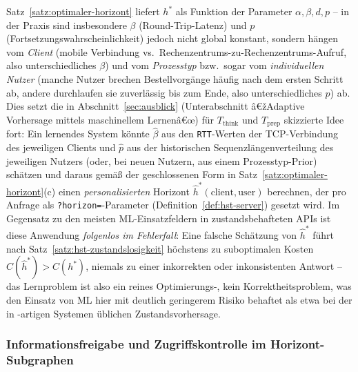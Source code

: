 ﻿\documentclass[a4paper,12pt]{article}
\theoremstyle{definition}
\begin{document}
Satz~\ref{satz:optimaler-horizont} liefert $h^\ast$ als Funktion der Parameter
$\alpha,\beta,d,p$ -- in der Praxis sind insbesondere $\beta$ (Round-Trip-Latenz) und $p$
(Fortsetzungswahrscheinlichkeit) jedoch nicht global konstant, sondern hängen vom
\emph{Client} (mobile Verbindung vs.\ Rechenzentrums-zu-Rechenzentrums-Aufruf, also
unterschiedliches $\beta$) und vom \emph{Prozesstyp} bzw.\ sogar vom \emph{individuellen
Nutzer} (manche Nutzer brechen Bestellvorgänge häufig nach dem ersten Schritt ab, andere
durchlaufen sie zuverlässig bis zum Ende, also unterschiedliches $p$) ab. Dies setzt die
in Abschnitt~\ref{sec:ausblick} (Unterabschnitt â€žAdaptive Vorhersage mittels
maschinellem Lernenâ€œ) für $T_{\mathrm{think}}$ und $T_{\mathrm{prep}}$ skizzierte Idee
fort: Ein lernendes System könnte $\hat\beta$ aus den \texttt{RTT}-Werten der
TCP-Verbindung des jeweiligen Clients und $\hat p$ aus der historischen
Sequenzlängenverteilung des jeweiligen Nutzers (oder, bei neuen Nutzern, aus einem
Prozesstyp-Prior) schätzen und daraus gemäß der geschlossenen Form in
Satz~\ref{satz:optimaler-horizont}(c) einen \emph{personalisierten} Horizont
$\hat h^\ast(\text{client},\text{user})$ berechnen, der pro Anfrage als
\texttt{?horizon=}-Parameter (Definition~\ref{def:hst-server}) gesetzt wird. Im
Gegensatz zu den meisten ML-Einsatzfeldern in zustandsbehafteten APIs ist diese Anwendung
\emph{folgenlos im Fehlerfall}: Eine falsche Schätzung von $\hat h^\ast$ führt nach
Satz~\ref{satz:hst-zustandslosigkeit} höchstens zu suboptimalen Kosten $C(\hat
h^\ast)>C(h^\ast)$, niemals zu einer inkorrekten oder inkonsistenten Antwort -- das
Lernproblem ist also ein reines Optimierungs-, kein Korrektheitsproblem, was den Einsatz
von ML hier mit deutlich geringerem Risiko behaftet als etwa bei der in
\cite{murata1989}-artigen Systemen üblichen Zustandsvorhersage.

\subsubsection{Informationsfreigabe und Zugriffskontrolle im Horizont-Subgraphen}
\end{document}
